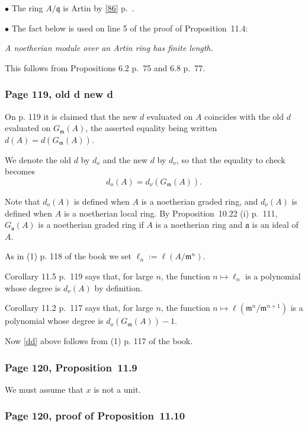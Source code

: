 \documentclass[12pt,letterpaper]{article}%
\newcommand{\mf}{\mathfrak}
\newcommand{\aaa}{\mf a}
\newcommand{\mmm}{\mf m}
\newcommand{\qqq}{\mf q}
\newcommand{\bu}{\bullet}
\newcommand{\nn}{\noindent}
\begin{document}
\nn$\bu$ The ring $A/\qqq$ is Artin by \eqref{86} p.~\pageref{86}.

\nn$\bu$ The fact below is used on line 5 of the proof of Proposition~11.4:

\emph{A noetherian module over an Artin ring has finite length.}

This follows from Propositions 6.2 p.~75 and 6.8 p.~77.

\subsubsection{Page 119, old d new d}\label{odnd}%

On p. 119 it is claimed that the new $d$ evaluated on $A$ coincides with the old $d$ evaluated on $G_\mmm(A)$, the asserted equality being written $d(A)=d(G_\mmm(A))$. 

We denote the old $d$ by $d_o$ and the new $d$ by $d_\nu$, so that the equality to check becomes 
\begin{equation}\label{dd}
d_o(A)=d_\nu(G_\mmm(A)).
\end{equation}

Note that $d_o(A)$ is defined when $A$ is a noetherian graded ring, and $d_\nu(A)$ is defined when $A$ is a noetherian local ring. By Proposition~10.22 (i) p.~111, $G_\aaa(A)$ is a noetherian graded ring if $A$ is a noetherian ring and $\aaa$ is an ideal of $A$.

As in (1) p. 118 of the book we set $\ell_n:=\ell(A/\mmm^n)$. 

Corollary 11.5 p.~119 says that, for large $n$, the function $n\mapsto\ell_n$ is a polynomial whose degree is $d_\nu(A)$ by definition. 

Corollary 11.2 p.~117 says that, for large $n$, the function $n\mapsto\ell(\mmm^n/\mmm^{n+1})$ is a polynomial whose degree is $d_o(G_\mmm(A))-1$.

Now \eqref{dd} above follows from (1) p. 117 of the book. 

\subsubsection{Page 120, Proposition~11.9}%

We must assume that $x$ is not a unit. 

\subsubsection{Page 120, proof of Proposition~11.10}%
\end{document}
